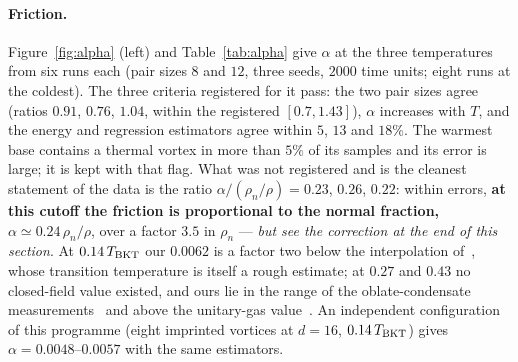 \documentclass[11pt,a4paper]{article}
\begin{document}
\paragraph{Friction.} Figure~\ref{fig:alpha} (left) and Table~\ref{tab:alpha} give $\alpha$ at the three
temperatures from six runs each (pair sizes $8$ and $12$, three seeds, $2000$ time units; eight runs at the coldest).
The three criteria registered for it pass: the two pair sizes agree (ratios $0.91$, $0.76$, $1.04$, within the
registered $[0.7,1.43]$), $\alpha$ increases with $T$, and the energy and regression estimators agree within $5$,
$13$ and $18\%$. The warmest base contains a thermal vortex in more than $5\%$ of its samples and its error is
large; it is kept with that flag. What was not registered and is the cleanest statement of the data is the ratio
$\alpha/(\rho_n/\rho)=0.23$, $0.26$, $0.22$: within errors, \textbf{at this cutoff the friction is proportional to the normal
fraction, $\alpha\simeq0.24\,\rho_n/\rho$}, over a factor $3.5$ in $\rho_n$ --- \emph{but see the correction at the end of this section}. At $0.14\,T_{\rm BKT}$ our $0.0062$
is a factor two below the interpolation of~\cite{Shukla2014}, whose transition temperature is itself a rough
estimate; at $0.27$ and $0.43$ no closed-field value existed, and ours lie in the range of the oblate-condensate
measurements~\cite{Moon2015} and above the unitary-gas value~\cite{Kwon2021}. An independent configuration of this
programme (eight imprinted vortices at $d=16$, $0.14\,T_{\rm BKT}$) gives $\alpha=0.0048$--$0.0057$ with the same
estimators.
\end{document}
